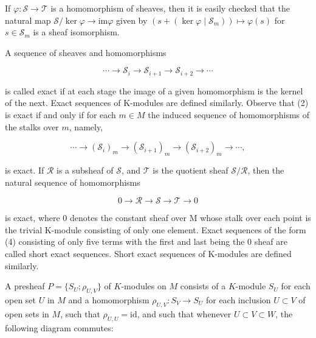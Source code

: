 \begin{definition}
If $\varphi: \mathcal{S} \to \mathcal{T}$ is a homomorphism of sheaves, then it is easily checked that the natural map $\mathcal{S}/\ker \varphi \to \mathrm{im} \varphi$ given by $(s + (\ker \varphi \mid \mathcal{S}_m)) \mapsto \varphi(s)$ for $s \in \mathcal{S}_m$ is a sheaf isomorphism.

A sequence of sheaves and homomorphisms

\begin{equation}
\tag{2}\label{eq:5.4:2}
\cdots\to\mathcal{S}_{i}\to\mathcal{S}_{i+1}\to\mathcal{S}_{i+2}\to\cdots
\end{equation}

is called exact if at each stage the image of a given homomorphism is the kernel of the next. Exact sequences of K-modules are defined similarly. Observe that (2) is exact if and only if for each $m\in M$ the induced sequence of homomorphisms of the stalks over $m$, namely,

\begin{equation}
\tag{3}\label{eq:5.4:3}
\cdots\to(\mathcal{S}_{i})_{m}\to(\mathcal{S}_{i+1})_{m}\to(\mathcal{S}_{i+2})_{m}\to\cdots,
\end{equation}

is exact. If $\mathcal{R}$ is a subsheaf of $\mathcal{S}$, and $\mathcal{T}$ is the quotient sheaf $\mathcal{S}/\mathcal{R}$, then the natural sequence of homomorphisms

\begin{equation}
\tag{4}\label{eq:5.4:4}
0\to\mathcal{R}\to\mathcal{S}\to\mathcal{T}\to0
\end{equation}

is exact, where 0 denotes the constant sheaf over M whose stalk over each point is the trivial K-module consisting of only one element. Exact sequences of the form (4) consisting of only five terms with the first and last being the 0 sheaf are called short exact sequences. Short exact sequences of K-modules are defined similarly.

\end{definition}

\label{thm:5.5} A presheaf $P = \{S_U; \rho_{U,V}\}$ of $K$-modules on $M$ consists of a $K$-module $S_U$ for each open set $U$ in $M$ and a homomorphism $\rho_{U,V}: S_V \to S_U$ for each inclusion $U \subset V$ of open sets in $M$, such that $\rho_{U,U} = \mathrm{id}$, and such that whenever $U \subset V \subset W$, the following diagram commutes: 

